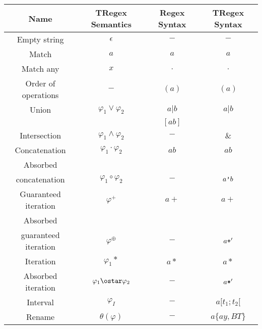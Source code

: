 \begin{tabular}{ |c|c|c|c| }
    \hline
    \textbf{Name} & \textbf{TRegex Semantics} & \textbf{Regex Syntax} & \textbf{TRegex Syntax} \\
    \hline
    Empty string & $\epsilon$ & $-$ & $-$ \\
    \hline
    Match & $a$ & $a$ & $a$ \\
    \hline
    Match any & $x$ & $.$ & $.$ \\
    \hline
    Order of operations & $-$ & $(a)$ & $(a)$ \\
    \hline
    Union & $\varphi_1\vee\varphi_2$ & $a|b$ & $a|b$ \\
    & & $[ab]$ &  \\
    \hline
    Intersection & $\varphi_1\wedge\varphi_2$ & $-$ & $\&$ \\
    \hline
    Concatenation & $\varphi_1\cdot\varphi_2$ & $ab$ & $ab$ \\
    \hline
    Absorbed & & & \\
    concatenation & $\varphi_1\circ\varphi_2$ & $-$ & $a\verb|'|b$ \\
    \hline
    Guaranteed iteration & $\varphi^+$ & $a+$ & $a+$ \\
    \hline
    Absorbed & & & \\
    guaranteed iteration & $\varphi^\oplus$ & $-$ & $a\verb|+|'$ \\
    \hline
    Iteration & $\varphi_1*$ & $a*$ & $a*$ \\
    \hline
    Absorbed iteration & $\varphi_1\ostar\varphi_2$ & $-$ & $a\verb|*|'$ \\
    \hline
    Interval & $\varphi_I$ & $-$ & $a[t_1;t_2[$ \\
    \hline
    Rename & $\theta(\varphi)$ & $-$ & $a\{ay,BT\}$ \\
    \hline
\end{tabular}
\cite*{Eugene2001}\cite*{Masaki2018}